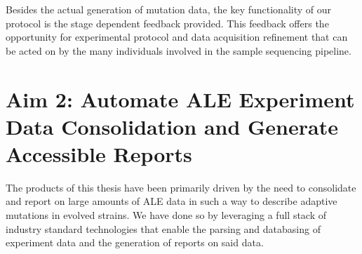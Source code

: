 \documentclass[12pt,final,masters,chapterheads]{ucsd}  %
\begin{document}
Besides the actual generation of mutation data, the key functionality of our protocol is the stage dependent feedback provided. This feedback offers the opportunity for experimental protocol and data acquisition refinement that can be acted on by the many individuals involved in the sample sequencing pipeline.

%
%
%
%

\chapter{Aim 2: Automate ALE Experiment Data Consolidation and Generate Accessible Reports}

%
%



The products of this thesis have been primarily driven by the need to consolidate and report on large amounts of ALE data in such a way to describe adaptive mutations in evolved strains. We have done so by leveraging a full stack of industry standard technologies that enable the parsing and databasing of experiment data and the generation of reports on said data.
\end{document}
